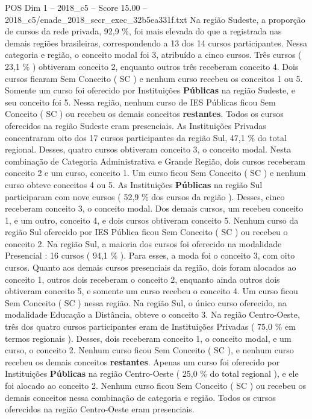 \begin{textsample}{POS Dim 1 – 2018\_c5 – Score 15.00 – 2018\_c5/enade\_2018\_secr\_exec\_32b5ea331f.txt}
Na região Sudeste, a proporção de cursos da rede privada, 92,9 \%, foi mais elevada do que a registrada nas demais regiões brasileiras, correspondendo a 13 dos 14 cursos participantes.
Nessa categoria e região, o conceito modal foi 3, atribuído a cinco cursos.
Três cursos ( 23,1 \% ) obtiveram conceito 2, enquanto outros três receberam conceito 4.
Dois cursos ficaram Sem Conceito ( SC ) e nenhum curso recebeu os conceitos 1 ou 5.
Somente um curso foi oferecido por Instituições \textbf{Públicas} na região Sudeste, e seu conceito foi 5.
Nessa região, nenhum curso de IES Públicas ficou Sem Conceito ( SC ) ou recebeu os demais conceitos \textbf{restantes}.
Todos os cursos oferecidos na região Sudeste eram presenciais.
As Instituições Privadas concentraram oito dos 17 cursos participantes da região Sul, 47,1 \% do total regional.
Desses, quatro cursos obtiveram conceito 3, o conceito modal.
Nesta combinação de Categoria Administrativa e Grande Região, dois cursos receberam conceito 2 e um curso, conceito 1.
Um curso ficou Sem Conceito ( SC ) e nenhum curso obteve conceitos 4 ou 5.
As Instituições \textbf{Públicas} na região Sul participaram com nove cursos ( 52,9 \% dos cursos da região ).
Desses, cinco receberam conceito 3, o conceito modal.
Dos demais cursos, um recebeu conceito 1, e um outro, conceito 4, e dois cursos obtiveram conceito 5.
Nenhum curso da região Sul oferecido por IES Pública ficou Sem Conceito ( SC ) ou recebeu o conceito 2.
Na região Sul, a maioria dos cursos foi oferecido na modalidade Presencial : 16 cursos ( 94,1 \% ).
Para esses, a moda foi o conceito 3, com oito cursos.
Quanto aos demais cursos presenciais da região, dois foram alocados ao conceito 1, outros dois receberam o conceito 2, enquanto ainda outros dois obtiveram conceito 5, e somente um curso recebeu o conceito 4.
Um curso ficou Sem Conceito ( SC ) nessa região.
Na região Sul, o único curso oferecido, na modalidade Educação a Distância, obteve o conceito 3.
Na região Centro-Oeste, três dos quatro cursos participantes eram de Instituições Privadas ( 75,0 \% em termos regionais ).
Desses, dois receberam conceito 1, o conceito modal, e um curso, o conceito 2.
Nenhum curso ficou Sem Conceito ( SC ), e nenhum curso recebeu os demais conceitos \textbf{restantes}.
Apenas um curso foi oferecido por Instituições \textbf{Públicas} na região Centro-Oeste ( 25,0 \% do total regional ), e ele foi alocado ao conceito 2.
Nenhum curso ficou Sem Conceito ( SC ) ou recebeu os demais conceitos nessa combinação de categoria e região.
Todos os cursos oferecidos na região Centro-Oeste eram presenciais.

\end{textsample}
